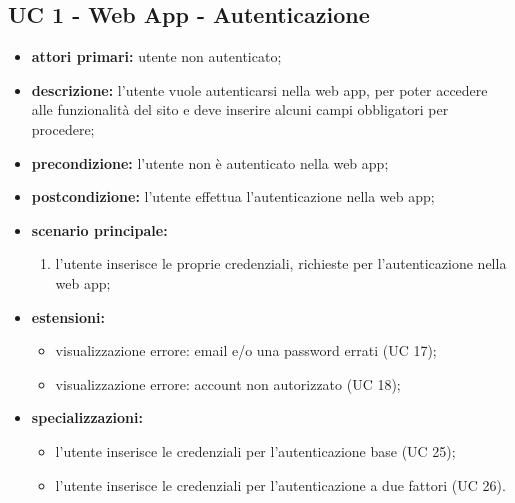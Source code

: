	\subsection{UC 1 - Web App - Autenticazione}


	\begin{itemize}
		\item \textbf{attori primari:} utente non autenticato;
		\item \textbf{descrizione:} l'utente vuole autenticarsi nella web app, per poter accedere alle funzionalità del sito e deve inserire alcuni campi obbligatori per procedere;
		\item \textbf{precondizione:} l'utente non è autenticato nella web app;
		\item \textbf{postcondizione:} l'utente effettua l'autenticazione nella web app;
		\item \textbf{scenario principale:}
		\begin{enumerate}
			\item l'utente inserisce le proprie credenziali, richieste per l'autenticazione nella web app;
		\end{enumerate}
		\item \textbf{estensioni:}
		\begin{itemize}
			\item visualizzazione errore: email e/o una password errati (UC 17);
			\item visualizzazione errore: account non autorizzato (UC 18);
		\end{itemize}
		\item \textbf{specializzazioni:}
		\begin{itemize}
			\item l'utente inserisce le credenziali per l'autenticazione base (UC 25);
			\item l'utente inserisce le credenziali per l'autenticazione a due fattori (UC 26).
		\end{itemize}
	\end{itemize}

